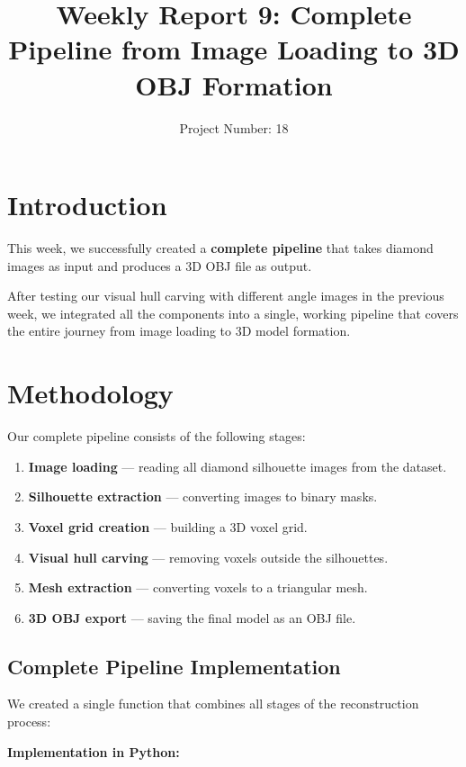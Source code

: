 \documentclass[a4paper,12pt]{article}
\title{Weekly Report 9: Complete Pipeline from Image Loading to 3D OBJ Formation}
\author{Project Number: 18}
\begin{document}
\date{}

\maketitle

\section{Introduction}

This week, we successfully created a \textbf{complete pipeline} that takes diamond images as input and produces a 3D OBJ file as output.  

After testing our visual hull carving with different angle images in the previous week, we integrated all the components into a single, working pipeline that covers the entire journey from image loading to 3D model formation.

\section{Methodology}

Our complete pipeline consists of the following stages:

\begin{enumerate}
    \item \textbf{Image loading} — reading all diamond silhouette images from the dataset.
    \item \textbf{Silhouette extraction} — converting images to binary masks.
    \item \textbf{Voxel grid creation} — building a 3D voxel grid.
    \item \textbf{Visual hull carving} — removing voxels outside the silhouettes.
    \item \textbf{Mesh extraction} — converting voxels to a triangular mesh.
    \item \textbf{3D OBJ export} — saving the final model as an OBJ file.
\end{enumerate}

\subsection{Complete Pipeline Implementation}

We created a single function that combines all stages of the reconstruction process:

\textbf{Implementation in Python:}
\end{document}
